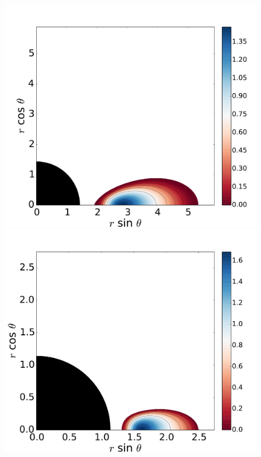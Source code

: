 \documentclass{aa}
\begin{document}
\begin{figure}
\includegraphics[scale=0.16]{figures/fig2_2_2.pdf}
\hspace{-0.3cm}
\includegraphics[scale=0.16]{figures/fig2_2_3.pdf}
\\

\end{figure}
\end{document}
